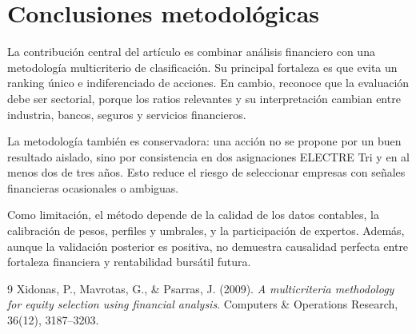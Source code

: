 \documentclass[11pt,a4paper]{article}
\begin{document}
\section{Conclusiones metodológicas}

La contribución central del artículo es combinar análisis financiero con una metodología multicriterio de clasificación. Su principal fortaleza es que evita un ranking único e indiferenciado de acciones. En cambio, reconoce que la evaluación debe ser sectorial, porque los ratios relevantes y su interpretación cambian entre industria, bancos, seguros y servicios financieros.

La metodología también es conservadora: una acción no se propone por un buen resultado aislado, sino por consistencia en dos asignaciones ELECTRE Tri y en al menos dos de tres años. Esto reduce el riesgo de seleccionar empresas con señales financieras ocasionales o ambiguas.

Como limitación, el método depende de la calidad de los datos contables, la calibración de pesos, perfiles y umbrales, y la participación de expertos. Además, aunque la validación posterior es positiva, no demuestra causalidad perfecta entre fortaleza financiera y rentabilidad bursátil futura.

\begin{thebibliography}{9}
Xidonas, P., Mavrotas, G., \& Psarras, J. (2009). \textit{A multicriteria methodology for equity selection using financial analysis}. Computers \& Operations Research, 36(12), 3187--3203.
\end{thebibliography}
\end{document}
